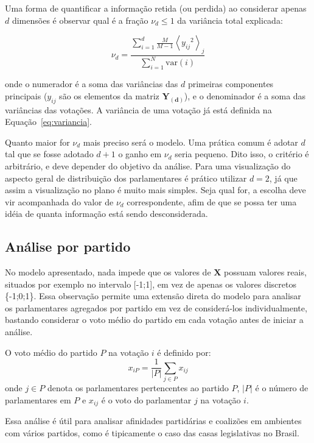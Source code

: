 \documentclass[
	article,			%
	12pt,				%
	oneside,			%
	a4paper,			%
	english,			%
	brazil,				%
	sumario=tradicional,
	oldfontcommands %
	]{abntex2}
\begin{document}
Uma forma de quantificar a informação retida (ou perdida) ao considerar apenas $d$ dimensões é observar qual é a fração $\nu_d \leq 1$ da variância total explicada:

\begin{equation}
\nu_d = \frac{\sum_{i=1}^{d}\frac{M}{M-1} \left< {y_{ij}}^{2} \right>_j } {\sum_{i=1}^N \mathrm{var}(i)}
\label{eq:porcentagem-variancia}
\end{equation}

onde o numerador é a soma das variâncias das $d$ primeiras componentes principais ($y_{ij}$ são os elementos da matriz $\mathbf{Y_{(d)}}$), e o denominador é a soma das variâncias das votações. A variância de uma votação já está definida na Equação~\ref{eq:variancia}.

Quanto maior for $\nu_d$ mais preciso será o modelo. Uma prática comum é adotar $d$ tal que se fosse adotado $d+1$ o ganho em $\nu_d$ seria pequeno. Dito isso, o critério é arbitrário, e deve depender do objetivo da análise. Para uma visualização do aspecto geral de distribuição dos parlamentares é prático utilizar $d=2$, já que assim a visualização no plano é muito mais simples. Seja qual for, a escolha deve vir acompanhada do valor de $\nu_d$ correspondente, afim de que se possa ter uma idéia de quanta informação está sendo desconsiderada.

\subsection{Análise por partido}

No modelo apresentado, nada impede que os valores de $\mathbf{X}$ possuam valores reais, situados por exemplo no intervalo [-1;1], em vez de apenas os valores discretos \{-1;0;1\}. Essa observação permite uma extensão direta do modelo para analisar os parlamentares agregados por partido em vez de considerá-los individualmente, bastando considerar o voto médio do partido em cada votação antes de iniciar a análise.

O voto médio do partido $P$ na votação $i$ é definido por:
\begin{equation}
  x_{iP} = \frac{1}{|P|}\sum_{j\in P} x_{ij}
  \label{eq:voto-partido}
\end{equation}
onde $j \in P$ denota os parlamentares pertencentes ao partido $P$, $|P|$ é o número de parlamentares em $P$ e $x_{ij}$ é o voto do parlamentar $j$ na votação $i$.

Essa análise é útil para analisar afinidades partidárias e coalizões em ambientes com vários partidos, como é tipicamente o caso das casas legislativas no Brasil.
\end{document}

